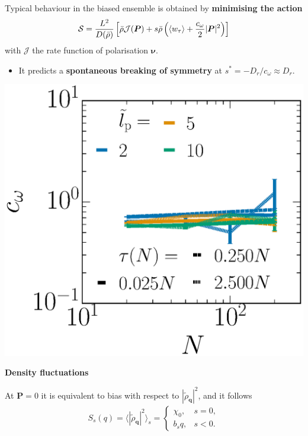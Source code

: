 \documentclass[25pt, a0paper, portrait, innermargin=1.0cm, blockverticalspace=-5mm]{tikzposter}
\renewcommand\paragraph[1]{
\begin{center}
  {\bf\color{CaRed} #1}
\end{center}}
\begin{document}
\begin{columns}
{\begin{multicols}{2}
Typical behaviour in the biased ensemble is obtained by \textbf{minimising the action}
\begin{align*}
{\cal S} = \frac{L^2}{D(\bar{\rho})} \left[ \bar\rho {\cal J}(\bm{P}) + s \bar\rho \left( \langle w_\tau\rangle + \frac{c_\omega}{2} | \bm{P} |^2 \right)\right]
\end{align*}
with $\mathcal{J}$ the rate function of polarisation $\bm{\nu}$.\\

\begin{itemize}
  \item It predicts a \textbf{spontaneous breaking of symmetry} at $s^* = -D_r/c_{\omega} \approx D_r$.\\
\end{itemize}

{
\centering
\includegraphics[width=0.8\linewidth]{covPW_Dk6500.eps}
}

\columnbreak
\paragraph{Density fluctuations}

At $\bm{P} = 0$ it is equivalent to bias with respect to $|\tilde{\rho}_{\bm{q}}|^2$, and it follows
\begin{align*}
S_s(q) = \langle|\tilde{\rho}_{\bm{q}}|^2\rangle_s = \begin{cases} \chi_0, &s=0, \\ b_s q, &s < 0. \end{cases}\\
\end{align*}


\end{multicols}}
\end{columns}
\end{document}
